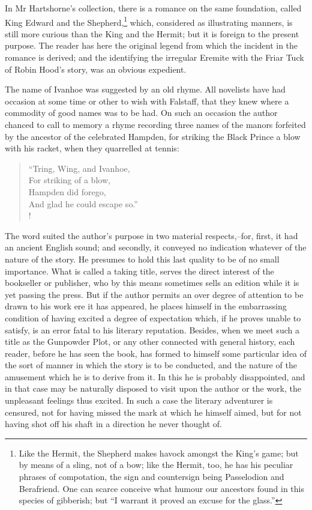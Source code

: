 In Mr Hartshorne's collection, there is a romance on the same
foundation, called King Edward and the Shepherd,\footnote{Like the Hermit,
the Shepherd makes havock amongst the
King's game; but by means of a sling, not of a bow; like the Hermit,
too, he has his peculiar phrases of compotation, the sign and
countersign being Passelodion and Berafriend. One can scarce conceive
what humour our ancestors found in this species of gibberish; but ``I
warrant it proved an excuse for the glass.''}
which, considered as illustrating manners, is still more curious than
the King and the Hermit; but it is foreign to the present purpose. The
reader has here the original legend from which the incident in the
romance is derived; and the identifying the irregular Eremite with the
Friar Tuck of Robin Hood's story, was an obvious expedient.

The name of Ivanhoe was suggested by an old rhyme. All novelists have
had occasion at some time or other to wish with Falstaff, that they knew
where a commodity of good names was to be had. On such an occasion the
author chanced to call to memory a rhyme recording three names of the
manors forfeited by the ancestor of the celebrated Hampden, for striking
the Black Prince a blow with his racket, when they quarrelled at tennis:

\begin{verse}
``Tring, Wing, and Ivanhoe,\\
For striking of a blow,\\
Hampden did forego,\\
And glad he could escape so.''\\!
\end{verse}

The word suited the author's purpose in two material respects,--for,
first, it had an ancient English sound; and secondly, it conveyed no
indication whatever of the nature of the story. He presumes to hold this
last quality to be of no small importance. What is called a taking
title, serves the direct interest of the bookseller or publisher, who by
this means sometimes sells an edition while it is yet passing the press.
But if the author permits an over degree of attention to be drawn to his
work ere it has appeared, he places himself in the embarrassing
condition of having excited a degree of expectation which, if he proves
unable to satisfy, is an error fatal to his literary reputation.
Besides, when we meet such a title as the Gunpowder Plot, or any other
connected with general history, each reader, before he has seen the
book, has formed to himself some particular idea of the sort of manner
in which the story is to be conducted, and the nature of the amusement
which he is to derive from it. In this he is probably disappointed, and
in that case may be naturally disposed to visit upon the author or the
work, the unpleasant feelings thus excited. In such a case the literary
adventurer is censured, not for having missed the mark at which he
himself aimed, but for not having shot off his shaft in a direction he
never thought of.

